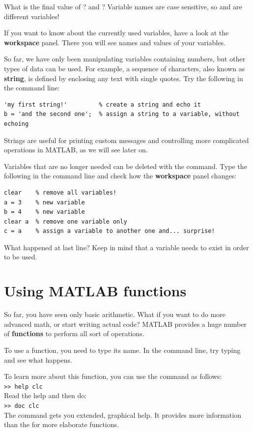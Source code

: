\documentclass{article}
\begin{document}
What is the final value of ? and ?
Variable names are case sensitive, so  and  are different variables!%

If you want to know about the currently used variables, have a look at the \textbf{workspace} panel.
There you will see names and values of your variables.

So far, we have only been manipulating variables containing numbers, but other types of data can be used.
For example, a sequence of characters, also known as \textbf{string}, is defined by enclosing any text with single quotes.
Try the following in the command line:
\begin{lstlisting}
'my first string!'         % create a string and echo it
b = 'and the second one';  % assign a string to a variable, without echoing
\end{lstlisting}
Strings are useful for printing custom messages and controlling more complicated
operations in MATLAB, as we will see later on. 

Variables that are no longer needed can be deleted with the  command.
Type the following in the command line and check how the \textbf{workspace} panel changes:
\begin{lstlisting}
clear    % remove all variables!
a = 3    % new variable
b = 4    % new variable
clear a  % remove one variable only
c = a    % assign a variable to another one and... surprise!
\end{lstlisting}
What happened at last line? Keep in mind that a variable needs to exist in order to be used.


\section{Using MATLAB functions}

So far, you have seen only basic arithmetic.
What if you want to do more advanced math, or start writing actual code?
MATLAB provides a huge number of \textbf{functions} to perform all sort of operations.

To use a function, you need to type its name.
In the command line, try typing  and see what happens.

To learn more about this function, you can use the  command as follows: \\
\verb|>> help clc| \\
Read the help and then do:\\
\verb|>> doc clc| \\
The  command gets you extended, graphical help. It provides more information than the  for more elaborate functions.
\end{document}
